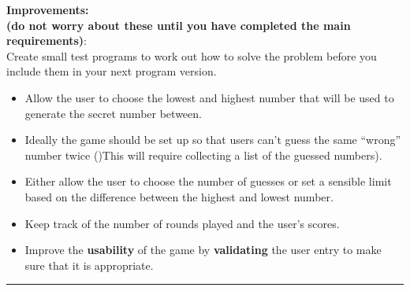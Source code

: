 \documentclass[a4paper,12pt]{article}
\begin{document}
\textbf{Improvements:\\ (do not worry about these until you have completed the main requirements)}:\\
Create small test programs to work out how to solve the problem before you include them in your next program version.
\begin{itemize}
	\item Allow the user to choose the lowest and highest number that will be used to generate the secret number between.
	\item Ideally the game should be set up so that users can’t guess the same ``wrong'' number twice ()This will require collecting a list of the guessed numbers).
	\item Either allow the user to choose the number of guesses or set a sensible limit based on the difference between the highest and lowest number.
	\item Keep track of the number of rounds played and the user’s scores.
	\item Improve the \textbf{usability} of the game by \textbf{validating} the user entry to make sure that it is appropriate.
\end{itemize}
\hrule\vspace{0.5cm}
\end{document}
